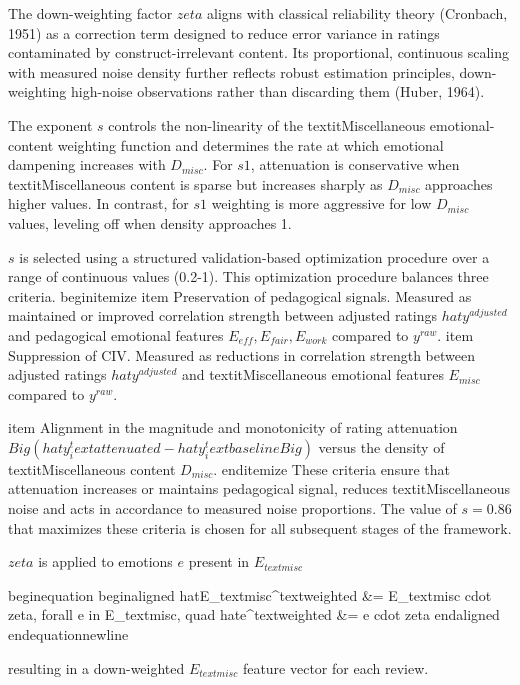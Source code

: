 The down-weighting factor $zeta$ aligns with classical reliability theory (Cronbach, 1951) as a correction term designed to reduce error variance in ratings contaminated by construct-irrelevant content. Its proportional, continuous scaling with measured noise density further reflects robust estimation principles, down-weighting high-noise observations rather than discarding them (Huber, 1964).

The exponent $s$ controls the non-linearity of the textit{Miscellaneous} emotional-content weighting function and determines the rate at which emotional dampening increases with $D_{misc}$. For $s1$, attenuation is conservative when textit{Miscellaneous} content is sparse but increases sharply as $D_{misc}$ approaches higher values. In contrast, for $s1$ weighting is more aggressive for low $D_{misc}$ values, leveling off when density approaches 1.  

$s$ is selected using a structured validation-based optimization procedure over a range of continuous values (0.2-1). This optimization procedure balances three criteria.
begin{itemize}
    item Preservation of pedagogical signals. Measured as maintained or improved correlation strength between adjusted ratings $hat{y}^{adjusted}$ and pedagogical emotional features $E_{eff},E_{fair},E_{work}$ compared to ${y}^{raw}$.
    item Suppression of CIV. Measured as reductions in correlation strength between adjusted ratings $hat{y}^{adjusted}$ and textit{Miscellaneous} emotional features $E_{misc}$ compared to ${y}^{raw}$. 
    
    item Alignment in the magnitude and monotonicity of rating attenuation $Big(hat{y}_i^text{attenuated} - hat{y}_i^text{baseline}Big)$  versus the density of textit{Miscellaneous} content $D_{misc}$.    
end{itemize}
These criteria ensure that attenuation increases or maintains pedagogical signal, reduces textit{Miscellaneous} noise and acts in accordance to measured noise proportions.
The value of $s = 0.86$ that maximizes these criteria is chosen for all subsequent stages of the framework.

$zeta$ is applied to emotions $e$ present in $E_{text{misc}}$

begin{equation}
begin{aligned}
    hat{E}_{text{misc}}^{text{weighted}} &= E_{text{misc}} cdot zeta, 
    forall e in E_{text{misc}}, quad hat{e}^{text{weighted}} &= e cdot zeta
end{aligned}
end{equation}newline

resulting in a down-weighted $E_{text{misc}}$ feature vector for each review.

